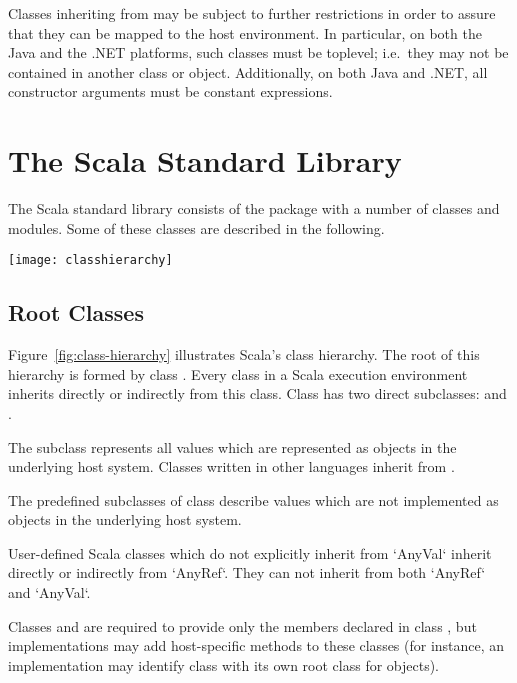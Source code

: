 Classes inheriting from  may be
subject to further restrictions in order to assure that they can be
mapped to the host environment. In particular, on both the Java and
the .NET platforms, such classes must be toplevel; i.e.\ they may not
be contained in another class or object.  Additionally, on both
Java and .NET, all constructor arguments must be constant expressions.


\chapter{The Scala Standard Library}

The Scala standard library consists of the package  with a
number of classes and modules. Some of these classes are described in
the following.

\begin{figure*}
\centering
\texttt{[image: classhierarchy]}
\vspace*{-1.5mm}
\caption{Class hierarchy of Scala.}
\label{fig:class-hierarchy}
\end{figure*}

\section{Root Classes}
\label{sec:cls-root}
\label{sec:cls-any}
\label{sec:cls-object}

Figure~\ref{fig:class-hierarchy} illustrates Scala's class
hierarchy.
The root of this hierarchy is formed by class .
Every class in a Scala execution environment inherits directly or
indirectly from this class.  Class  has two direct
subclasses:  and .

The subclass  represents all values which are represented
as objects in the underlying host system. Classes written in other languages
inherit from .

The predefined subclasses of class  describe
values which are not implemented as objects in the underlying host
system.

User-defined Scala classes which do not explicitly inherit from
`AnyVal` inherit directly or indirectly from `AnyRef`. They can
not inherit from both `AnyRef` and `AnyVal`.

Classes  and  are required to provide only
the members declared in class , but implementations may add
host-specific methods to these classes (for instance, an
implementation may identify class  with its own root
class for objects).

